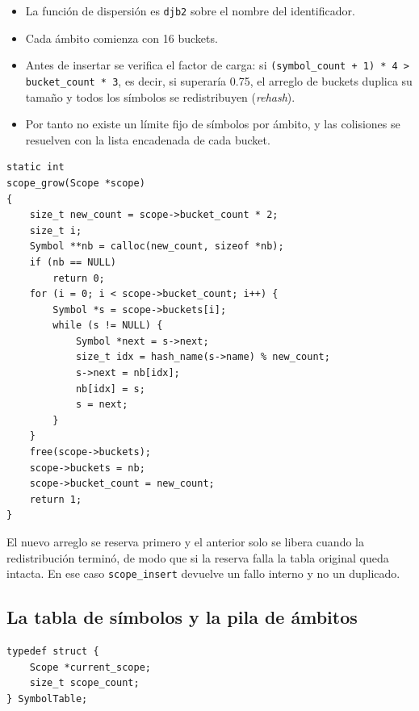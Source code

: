 \documentclass[12pt,letterpaper]{article}
\begin{document}
\begin{itemize}
\item La función de dispersión es \texttt{djb2} sobre el nombre del identificador.
  
\item Cada ámbito comienza con 16 buckets.
  
\item Antes de insertar se verifica el factor de carga: si \texttt{(symbol\_count + 1) * 4 > bucket\_count * 3},
  es decir, si superaría 0.75, el arreglo de buckets duplica su tamaño y todos los símbolos se redistribuyen
  (\emph{rehash}).
  
\item Por tanto no existe un límite fijo de símbolos por ámbito, y las colisiones se resuelven con la lista
  encadenada de cada bucket.
\end{itemize}

\begin{lstlisting}[style=modernc, caption={Crecimiento de la tabla hash en \texttt{scope.c}.}]
static int
scope_grow(Scope *scope)
{
    size_t new_count = scope->bucket_count * 2;
    size_t i;
    Symbol **nb = calloc(new_count, sizeof *nb);
    if (nb == NULL)
        return 0;
    for (i = 0; i < scope->bucket_count; i++) {
        Symbol *s = scope->buckets[i];
        while (s != NULL) {
            Symbol *next = s->next;
            size_t idx = hash_name(s->name) % new_count;
            s->next = nb[idx];
            nb[idx] = s;
            s = next;
        }
    }
    free(scope->buckets);
    scope->buckets = nb;
    scope->bucket_count = new_count;
    return 1;
}
\end{lstlisting}

\bigskip

El nuevo arreglo se reserva primero y el anterior solo se libera cuando la redistribución terminó, de modo que
si la reserva falla la tabla original queda intacta. En ese caso \texttt{scope\_insert} devuelve un fallo
interno y no un duplicado.

\subsection*{La tabla de símbolos y la pila de ámbitos}

\begin{lstlisting}[style=modernc, caption={Estructura \texttt{SymbolTable} de \texttt{symbol\_table.h}.}]
typedef struct {
    Scope *current_scope;
    size_t scope_count;
} SymbolTable;
\end{lstlisting}
\end{document}
